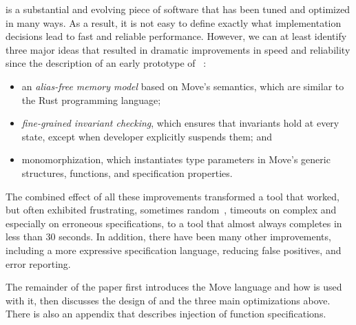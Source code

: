 \MVP is a substantial and evolving piece of software that has been tuned and
optimized in many ways.  As a result, it is not easy to define exactly what
implementation decisions lead to fast and reliable performance.  However, we can
at least identify three major ideas that resulted in dramatic improvements in
speed and reliability since the description of an early prototype of
\MVP~\cite{MOVE_PROVER}:
\begin{itemize}
\item an \emph{alias-free memory model} based on Move's semantics, which are
  similar to the Rust programming language;
\item \emph{fine-grained invariant checking}, which ensures that invariants hold
  at every state, except when developer explicitly suspends them; and
\item monomorphization, which instantiates type parameters in Move's generic
  structures, functions, and specification properties.
\end{itemize}
The combined effect of all these improvements transformed a tool that worked,
but often exhibited frustrating, sometimes random~\cite{BUTTERFLY}, timeouts on
complex and especially on erroneous specifications, to a tool that almost always
completes in less than 30 seconds.  In addition, there have been many other
improvements, including a more expressive specification language, reducing false
positives, and error reporting.

The remainder of the paper first introduces the Move language and how \MVP is
used with it, then discusses the design of \MVP and the three main optimizations
above.  There is also an appendix that describes injection of function
specifications.

